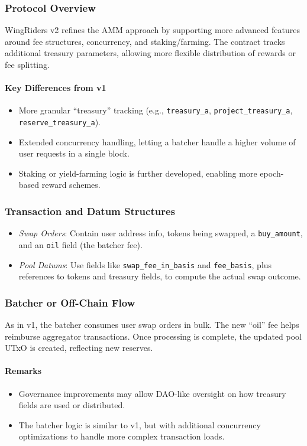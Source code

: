 \documentclass{article}
\begin{document}
\subsubsection{Protocol Overview}
WingRiders v2 refines the AMM approach by supporting more advanced features around fee structures, concurrency, and staking/farming. The contract tracks additional treasury parameters, allowing more flexible distribution of rewards or fee splitting.

\paragraph{Key Differences from v1}
\begin{itemize}
    \item More granular ``treasury'' tracking (e.g., \texttt{treasury\_a}, \texttt{project\_treasury\_a}, \texttt{reserve\_treasury\_a}).
    \item Extended concurrency handling, letting a batcher handle a higher volume of user requests in a single block.
    \item Staking or yield-farming logic is further developed, enabling more epoch-based reward schemes.
\end{itemize}

\subsubsection{Transaction and Datum Structures}
\begin{itemize}
    \item \emph{Swap Orders}: Contain user address info, tokens being swapped, a \texttt{buy\_amount}, and an \texttt{oil} field (the batcher fee).
    \item \emph{Pool Datums}: Use fields like \texttt{swap\_fee\_in\_basis} and \texttt{fee\_basis}, plus references to tokens and treasury fields, to compute the actual swap outcome.
\end{itemize}

\subsubsection{Batcher or Off-Chain Flow}
As in v1, the batcher consumes user swap orders in bulk. The new ``oil'' fee helps reimburse aggregator transactions. Once processing is complete, the updated pool UTxO is created, reflecting new reserves.

\paragraph{Remarks}
\begin{itemize}
    \item Governance improvements may allow DAO-like oversight on how treasury fields are used or distributed.
    \item The batcher logic is similar to v1, but with additional concurrency optimizations to handle more complex transaction loads.
\end{itemize}
\end{document}
